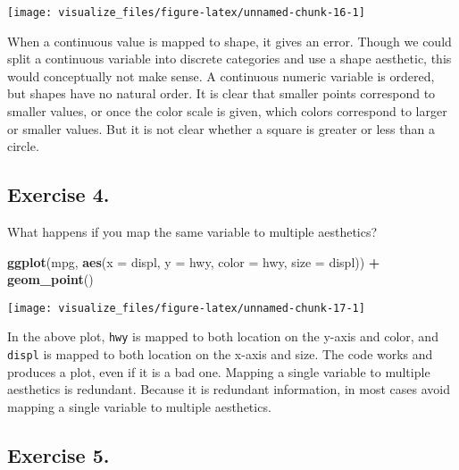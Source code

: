 \documentclass[]{book}
\newenvironment{Shaded}{\begin{snugshade}}{\end{snugshade}}
\newcommand{\DataTypeTok}[1]{\textcolor[rgb]{0.13,0.29,0.53}{#1}}
\newcommand{\KeywordTok}[1]{\textcolor[rgb]{0.13,0.29,0.53}{\textbf{#1}}}
\newcommand{\NormalTok}[1]{#1}
\newcommand{\OperatorTok}[1]{\textcolor[rgb]{0.81,0.36,0.00}{\textbf{#1}}}
\newcommand{\StringTok}[1]{\textcolor[rgb]{0.31,0.60,0.02}{#1}}
\theoremstyle{definition}
\theoremstyle{definition}
\theoremstyle{definition}
\theoremstyle{remark}
\begin{document}
\begin{center}\texttt{[image: visualize\_files/figure-latex/unnamed-chunk-16-1]} \end{center}

When a continuous value is mapped to shape, it gives an error. Though we
could split a continuous variable into discrete categories and use a
shape aesthetic, this would conceptually not make sense. A continuous
numeric variable is ordered, but shapes have no natural order. It is
clear that smaller points correspond to smaller values, or once the
color scale is given, which colors correspond to larger or smaller
values. But it is not clear whether a square is greater or less than a
circle.

\hypertarget{exercise-4.-1}{%
\subsection{Exercise 4.}\label{exercise-4.-1}}

What happens if you map the same variable to multiple aesthetics?

\begin{Shaded}
\begin{Highlighting}[]
\KeywordTok{ggplot}\NormalTok{(mpg, }\KeywordTok{aes}\NormalTok{(}\DataTypeTok{x =}\NormalTok{ displ, }\DataTypeTok{y =}\NormalTok{ hwy, }\DataTypeTok{color =}\NormalTok{ hwy, }\DataTypeTok{size =}\NormalTok{ displ)) }\OperatorTok{+}
\StringTok{  }\KeywordTok{geom_point}\NormalTok{()}
\end{Highlighting}
\end{Shaded}

\begin{center}\texttt{[image: visualize\_files/figure-latex/unnamed-chunk-17-1]} \end{center}

In the above plot, \texttt{hwy} is mapped to both location on the y-axis
and color, and \texttt{displ} is mapped to both location on the x-axis
and size. The code works and produces a plot, even if it is a bad one.
Mapping a single variable to multiple aesthetics is redundant. Because
it is redundant information, in most cases avoid mapping a single
variable to multiple aesthetics.

\hypertarget{exercise-5.-1}{%
\subsection{Exercise 5.}\label{exercise-5.-1}}
\end{document}
